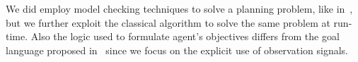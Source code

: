 We did employ model checking techniques to solve a planning problem, 
like in~\cite{Bertoli2001}, but  we further exploit the classical algorithm to solve the same problem at run-time. Also the logic used to formulate agent's objectives differs from the goal language proposed in~\cite{LagoPT02} since we focus on the explicit use of observation signals.




